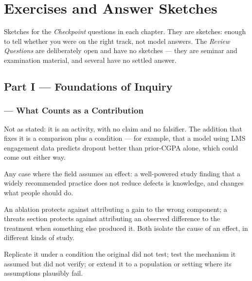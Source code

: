 \chapter{Exercises and Answer Sketches}\label{app:exercises}

Sketches for the \emph{Checkpoint} questions in each chapter. They are sketches:
enough to tell whether you were on the right track, not model answers. The
\emph{Review Questions} are deliberately open and have no sketches --- they are
seminar and examination material, and several have no settled answer.

\section{Part I --- Foundations of Inquiry}

\subsection*{ --- What Counts as a Contribution}
\begin{tightnum}
  \item Not as stated: it is an activity, with no claim and no falsifier. The
    addition that fixes it is a comparison plus a condition --- for example,
    that a model using LMS engagement data predicts dropout better than
    prior-CGPA alone, which could come out either way.
  \item Any case where the field assumes an effect: a well-powered study
    finding that a widely recommended practice does not reduce defects is
    knowledge, and changes what people should do.
  \item An ablation protects against attributing a gain to the wrong component;
    a threats section protects against attributing an observed difference to
    the treatment when something else produced it. Both isolate the cause of
    an effect, in different kinds of study.
  \item Replicate it under a condition the original did not test; test the
    mechanism it assumed but did not verify; or extend it to a population or
    setting where its assumptions plausibly fail.
\end{tightnum}

